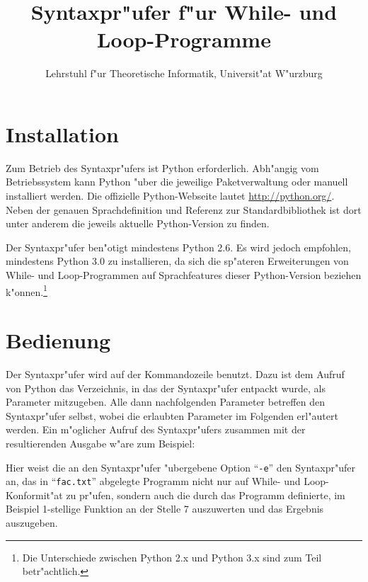 \documentclass[a4paper,ngerman]{article}
\begin{document}
\newcommand{\qtt}[1]{"`\texttt{#1}"'}
\title{Syntaxpr"ufer f"ur While- und Loop-Programme}
\author{Lehrstuhl f"ur Theoretische Informatik, Universit"at W"urzburg}
\maketitle
\section{Installation}
Zum Betrieb des Syntaxpr"ufers ist Python erforderlich. Abh"angig vom
Betriebssystem kann Python "uber die jeweilige Paketverwaltung oder
manuell installiert werden. Die offizielle Python-Webseite lautet
\url{http://python.org/}. Neben der genauen Sprachdefinition und
Referenz zur Standardbibliothek ist dort unter anderem die jeweils
aktuelle Python-Version zu finden.

Der Syntaxpr"ufer ben"otigt mindestens Python 2.6. Es wird jedoch
empfohlen, mindestens Python 3.0 zu installieren, da sich die
sp"ateren Erweiterungen von While- und Loop-Programmen auf
Sprachfeatures dieser Python-Version beziehen k"onnen.\footnote{Die
  Unterschiede zwischen Python 2.x und Python 3.x sind zum Teil
  betr"achtlich.}
\section{Bedienung}
Der Syntaxpr"ufer wird auf der Kommandozeile benutzt. Dazu ist dem
Aufruf von Python das Verzeichnis, in das der Syntaxpr"ufer entpackt
wurde, als Parameter mitzugeben. Alle dann nachfolgenden Parameter
betreffen den Syntaxpr"ufer selbst, wobei die erlaubten Parameter im
Folgenden erl"autert werden. Ein m"oglicher Aufruf des Syntaxpr"ufers
zusammen mit der resultierenden Ausgabe w"are zum Beispiel:
Hier weist die an den Syntaxpr"ufer "ubergebene Option \qtt{-e} den
Syntaxpr"ufer an, das in \qtt{fac.txt} abgelegte Programm nicht nur auf While- und
Loop-Konformit"at zu pr"ufen, sondern auch die durch das Programm
definierte, im Beispiel 1-stellige Funktion an der Stelle 7
auszuwerten und das Ergebnis auszugeben.
\end{document}
